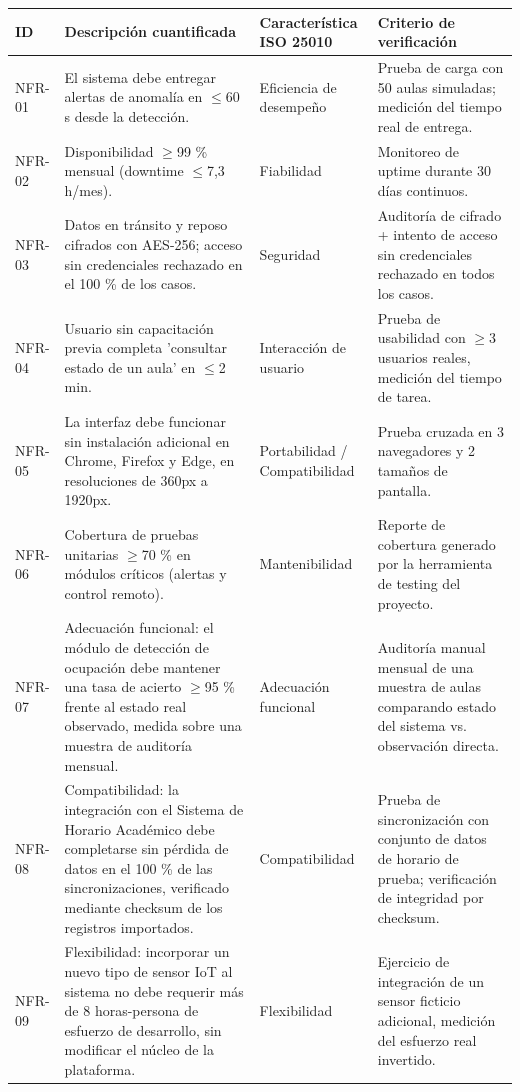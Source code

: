 \begingroup
\small
\begin{longtable}{|p{3.9cm}|p{3.9cm}|p{3.9cm}|p{3.9cm}|}
\hline
ID & Descripción cuantificada & Característica ISO 25010 & Criterio de verificación \\ \hline
NFR-01 & El sistema debe entregar alertas de anomalía en $\leq$60 s desde la detección. & Eficiencia de desempeño & Prueba de carga con 50 aulas simuladas; medición del tiempo real de entrega. \\ \hline
NFR-02 & Disponibilidad $\geq$99 \% mensual (downtime $\leq$7,3 h/mes). & Fiabilidad & Monitoreo de uptime durante 30 días continuos. \\ \hline
NFR-03 & Datos en tránsito y reposo cifrados con AES-256; acceso sin credenciales rechazado en el 100 \% de los casos. & Seguridad & Auditoría de cifrado + intento de acceso sin credenciales rechazado en todos los casos. \\ \hline
NFR-04 & Usuario sin capacitación previa completa 'consultar estado de un aula' en $\leq$2 min. & Interacción de usuario & Prueba de usabilidad con $\geq$3 usuarios reales, medición del tiempo de tarea. \\ \hline
NFR-05 & La interfaz debe funcionar sin instalación adicional en Chrome, Firefox y Edge, en resoluciones de 360px a 1920px. & Portabilidad / Compatibilidad & Prueba cruzada en 3 navegadores y 2 tamaños de pantalla. \\ \hline
NFR-06 & Cobertura de pruebas unitarias $\geq$70 \% en módulos críticos (alertas y control remoto). & Mantenibilidad & Reporte de cobertura generado por la herramienta de testing del proyecto. \\ \hline
NFR-07 & Adecuación funcional: el módulo de detección de ocupación debe mantener una tasa de acierto $\geq$95 \% frente al estado real observado, medida sobre una muestra de auditoría mensual. & Adecuación funcional & Auditoría manual mensual de una muestra de aulas comparando estado del sistema vs. observación directa. \\ \hline
NFR-08 & Compatibilidad: la integración con el Sistema de Horario Académico debe completarse sin pérdida de datos en el 100 \% de las sincronizaciones, verificado mediante checksum de los registros importados. & Compatibilidad & Prueba de sincronización con conjunto de datos de horario de prueba; verificación de integridad por checksum. \\ \hline
NFR-09 & Flexibilidad: incorporar un nuevo tipo de sensor IoT al sistema no debe requerir más de 8 horas-persona de esfuerzo de desarrollo, sin modificar el núcleo de la plataforma. & Flexibilidad & Ejercicio de integración de un sensor ficticio adicional, medición del esfuerzo real invertido. \\ \hline

\end{longtable}

